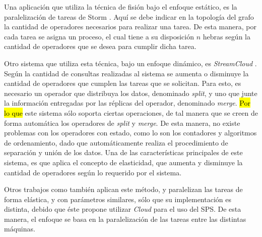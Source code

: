 

Una aplicación que utiliza la técnica de fisión bajo el enfoque estático, es la paralelización de tareas de Storm \citep{bookstorm}. Aquí se debe indicar en la topología del grafo la cantidad de operadores necesarios para realizar una tarea. De esta manera, por cada tarea se asigna un proceso, el cual tiene a su disposición $n$ hebras según la cantidad de operadores que se desea para cumplir dicha tarea.

Otro sistema que utiliza esta técnica, bajo un enfoque dinámico, es \textit{StreamCloud} \citep{GulisanoJPSV12}. Según la cantidad de consultas realizadas al sistema se aumenta o disminuye la cantidad de operadores que cumplen las tareas que se solicitan. Para esto, es necesario un operador que distribuya los datos, denominado \textit{split}, y uno que junte la información entregadas por las réplicas del operador, denominado \textit{merge}. \hl{Por lo que} este sistema sólo soporta ciertas operaciones, de tal manera que se creen de forma automática los operadores de \textit{split} y \textit{merge}. De esta manera, no existe problemas con los operadores con estado, como lo son los contadores y algoritmos de ordenamiento, dado que automáticamente realiza el procedimiento de separación y unión de los datos. Una de las características principales de este sistema, es que aplica el concepto de elasticidad, que aumenta y disminuye la cantidad de operadores según lo requerido por el sistema.

Otros trabajos como \citep{GedikSHW14, SchneiderAGBW09} también aplican este método, y paralelizan las tareas de forma elástica, y con parámetros similares, sólo que su implementación es distinta, debido que éste propone utilizar \textit{Cloud} para el uso del SPS. De esta manera, el enfoque se basa en la paralelización de las tareas entre las distintas máquinas.

